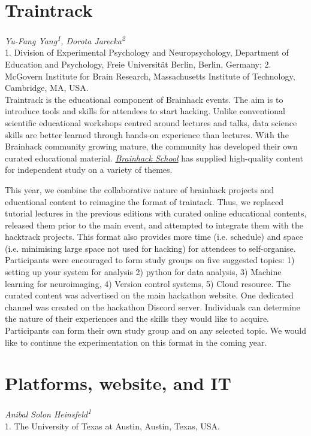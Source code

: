 \documentclass[10pt,a4paper,twocolumns]{proc}
\newcommand{\authors}[1]{\emph{\footnotesize #1} \\}
\newcommand{\affiliations}[1]{{\scriptsize #1} \\}
\begin{document}
\section{Traintrack}
\authors{Yu-Fang Yang\textsuperscript{1}, %
Dorota Jarecka\textsuperscript{2}}
%
\affiliations{1. Division of Experimental Psychology and Neuropsychology, Department of Education and Psychology, Freie Universität Berlin, Berlin, Germany; %
2. McGovern Institute for Brain Research, Massachusetts Institute of Technology, Cambridge, MA, USA.}

Traintrack is the educational component of Brainhack events. The aim is
to introduce tools and skills for attendees to start hacking. Unlike
conventional scientific educational workshops centred around lectures
and talks, data science skills are better learned through hands-on
experience than lectures. With the Brainhack community growing mature,
the community has developed their own curated educational material.
\href{https://school.brainhackmtl.org/}{\emph{Brainhack School}} has
supplied high-quality content for independent study on a variety of
themes.

This year, we combine the collaborative nature of brainhack projects and
educational content to reimagine the format of traintack. Thus, we
replaced tutorial lectures in the previous editions with curated online
educational contents, released them prior to the main event, and
attempted to integrate them with the hacktrack projects. This format
also provides more time (i.e. schedule) and space (i.e. minimising large
space not used for hacking) for attendees to self-organise. Participants
were encouraged to form study groups on five suggested topics: 1)
setting up your system for analysis 2) python for data analysis, 3)
Machine learning for neuroimaging, 4) Version control systems, 5) Cloud
resource. The curated content was advertised on the main hackathon
website. One dedicated channel was created on the hackathon Discord
server. Individuals can determine the nature of their experiences and
the skills they would like to acquire. Participants can form their own
study group and on any selected topic. We would like to continue the
experimentation on this format in the coming year.

\section{Platforms, website, and IT}
\authors{Anibal Solon Heinsfeld\textsuperscript{1}}
%
\affiliations{1. The University of Texas at Austin, Austin, Texas, USA.}
\end{document}
